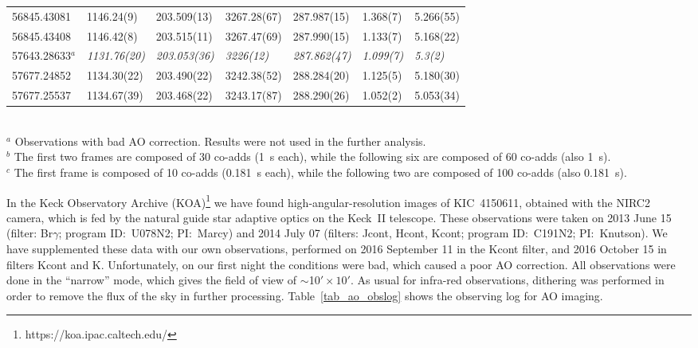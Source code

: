 \documentclass{aa}
\begin{document}
\begin{table*}
\begin{tabular}{lllllll}
56845.43081	& 1146.24(9)  & 203.509(13) & 3267.28(67) & 287.987(15) & 1.368(7) & 5.266(55) \\ 
56845.43408	& 1146.42(8)  & 203.515(11) & 3267.47(69) & 287.990(15) & 1.133(7) & 5.168(22) \\ 
57643.28633$^a$	& \it 1131.76(20) & \it 203.053(36) & \it 3226(12)&\it 287.862(47)& \it 1.099(7) & \it 5.3(2) \\
57677.24852	& 1134.30(22) & 203.490(22) & 3242.38(52) & 288.284(20) & 1.125(5) & 5.180(30) \\ 
57677.25537	& 1134.67(39) & 203.468(22) & 3243.17(87) & 288.290(26) & 1.052(2) & 5.053(34) \\
\hline 
\end{tabular}
\\$^a$ Observations with bad AO correction. Results were not used in the further analysis.
\\$^b$ The first two frames are composed of 30 co-adds (1~s each), while
the following six are composed of 60 co-adds (also 1~s).
\\$^c$ The first frame is composed of 10 co-adds (0.181~s each), while 
the following two are composed of 100 co-adds (also 0.181~s).
\end{table*}

In the Keck Observatory Archive (KOA)\footnote{https://koa.ipac.caltech.edu/} we
have found high-angular-resolution images of KIC~4150611, obtained with the
NIRC2 camera, which is fed by the natural guide star adaptive optics 
\citep[NGS~AO;][]{wiz00} on the Keck~II telescope. These observations were taken 
on 2013 June 15 (filter: Br$\gamma$; program ID:~U078N2; PI:~Marcy) and 2014 
July 07 (filters: Jcont, Hcont, Kcont; program ID:~C191N2; PI:~Knutson).
We have supplemented these data with our own observations, performed on 2016 
September 11 in the Kcont filter, and 2016 October 15 in filters Kcont and K.
Unfortunately, on our first night the conditions were bad, which caused a poor AO correction. 
All observations were done in the ``narrow'' mode, which gives the field of view of 
$\sim$10$'\times10'$. As usual for infra-red observations, dithering was performed
in order to remove the flux of the sky in further processing.
Table~\ref{tab_ao_obslog} shows the observing log for AO imaging.
\end{document}
